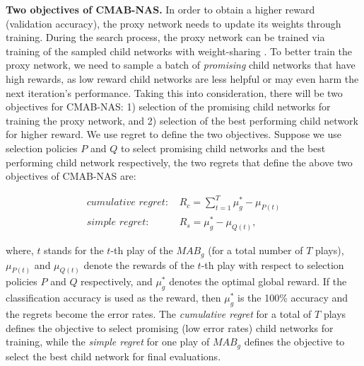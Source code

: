 \documentclass[conference]{IEEEtran}
\begin{document}
\noindent\textbf{Two objectives of CMAB-NAS.}
In order to obtain a higher reward (validation accuracy), the proxy network needs to update its weights through training. During the search process, the proxy network can be trained via training of the sampled child networks with weight-sharing \cite{pham2018efficient}. To better train the proxy network, we need to sample a batch of \emph{promising} child networks that have high rewards, as low reward child networks are less helpful or may even harm the next iteration's performance.
Taking this into consideration, there will be two objectives for CMAB-NAS: 1) selection of the promising child networks for training the proxy network, and 2) selection of the best performing child network for higher reward. We use regret to define the two objectives. Suppose we use selection policies $P$ and $Q$ to select promising child networks and the best performing child network respectively, the two regrets that define the above two objectives of CMAB-NAS are:
\begin{linenomath*}
\begin{align} 
\label{eq:regrets}
\textit{cumulative regret: }& R_c = \sum_{t=1}^{T} \mu_g^* - \mu_{P(t)} \\ 
\textit{simple regret:  }& R_s = \mu_g^* - \mu_{Q(t)},
\end{align}
\end{linenomath*}
where, $t$ stands for the $t$-th play of the $MAB_g$ (for a total number of $T$ plays), $\mu_{P(t)}$ and $\mu_{Q(t)}$ denote the rewards of the $t$-th play with respect to selection policies $P$ and $Q$ respectively, and $\mu_g^*$ denotes the optimal global reward.
If the classification accuracy is used as the reward, then $\mu_g^*$ is the 100\% accuracy and the regrets become the error rates.
The \emph{cumulative regret} for a total of $T$ plays defines the objective to select promising (low error rates) child networks for training, while the \emph{simple regret} for one play of $MAB_g$ defines the objective to select the best child network for final evaluations.
\end{document}
